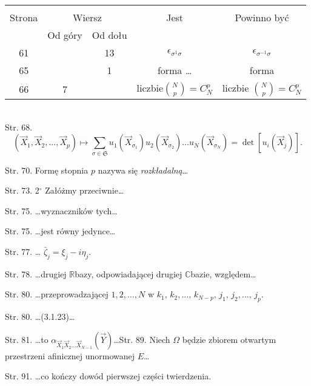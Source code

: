 \documentclass[a4paper,11pt]{article}
\begin{document}
\begin{center}
  \begin{tabular}{|c|c|c|c|c|}
    \hline
    & \multicolumn{2}{c|}{} & & \\
    Strona & \multicolumn{2}{c|}{Wiersz} & Jest
                              & Powinno być \\ \cline{2-3}
    & Od góry & Od dołu & & \\
    \hline
    61  & & 13 & $\epsilon_{ \sigma^{ 1 } \sigma }$
           & $\epsilon_{ \sigma^{ -1 } \sigma }$ \\
    65  & &  1 & forma \ldots & forma \\
    66  &  7 & & liczbie${ N \choose p } =  C^{ p }_{ N } $
           & liczbie ${ N \choose p } =  C^{ p }_{ N } $ \\
    \hline
  \end{tabular}
\end{center}
\noi \\
\start Str. 68.
$$( \vec{ X }_{ 1 }, \vec{ X }_{ 2 }, \ldots, \vec{ X }_{ p })
\mapsto \sum_{\sigma \in \mathfrak{ S } } u_{ 1 }( \vec{ X }_{
  \sigma_{ 1 } } ) u_{ 2 }( \vec{ X }_{ \sigma_{ 2 } } ) \ldots u_{ N
}( \vec{ X }_{ \sigma_{ N } } ) = \det[ u_{ i }( \vec{ X }_{ j } ) ]
\textrm{.}$$

\start Str. 70. Formę stopnia $p$ nazywa się \emph{rozkładalną}\ldots

\start Str. 73. 2$^{\circ}$ Załóżmy przeciwnie\ldots

\start Str. 75. \ldots wyznaczników tych\ldots

\start Str. 75. \ldots jest równy jedynce\ldots

\start Str. 77. \ldots
$\bar{ \zeta }_{ j } = \xi_{ j } - i \eta_{ j }$.

\start Str. 78. \ldots drugiej $\mathbb{R}$\dywiz bazy, odpowiadającej
drugiej $\mathbb{C}$\dywiz bazie, względem\ldots

\start Str. 80. \ldots przeprowadzającej $1, 2, \ldots, N$ w
$k_{ 1 }, \, k_{ 2 }, \ldots, \, k_{ N - p }, \, j_{ 1 }, \, j_{ 2 },
\ldots, \, j_{ p }$.

\start Str. 80. \ldots (3.1.23)\ldots

\start Str. 81. \ldots to
$\alpha_{ \vec{ X }_{ 1 } \vec{ X }_{ 2 } \ldots \vec{ X }_{ N - 1 } }
( \vec{ Y } )$\ldots \start Str. 89. Niech $\Omega$ będzie zbiorem
otwartym przestrzeni af\mbox{}inicznej unormowanej $E$\ldots

\start Str. 91. \ldots co kończy dowód pierwszej części twierdzenia.
\end{document}
